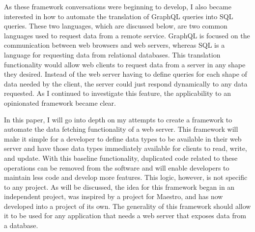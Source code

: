 As these framework conversations were beginning to develop, I also became interested in how to automate the translation of GraphQL queries into SQL queries.  These two languages, which are discussed below, are two common languages used to request data from a remote service.  GraphQL is focused on the communication between web browsers and web servers, whereas SQL is a language for requesting data from relational databases.  This translation functionality would allow web clients to request data from a server in any shape they desired.  Instead of the web server having to define queries for each shape of data needed by the client, the server could just respond dynamically to any data requested.  As I continued to investigate this feature, the applicability to an opinionated framework became clear.

In this paper, I will go into depth on my attempts to create a framework to automate the data fetching functionality of a web server. This framework will make it simple for a developer to define data types to be available in their web server and have those data types immediately available for clients to read, write, and update.  With this baseline functionality, duplicated code related to these operations can be removed from the software and will enable developers to maintain less code and develop more features.  This logic, however, is not specific to any project.  As will be discussed, the idea for this framework began in an independent project, was inspired by a project for Maestro, and has now developed into a project of its own.  The generality of this framework should allow it to be used for any application that needs a web server that exposes data from a database.